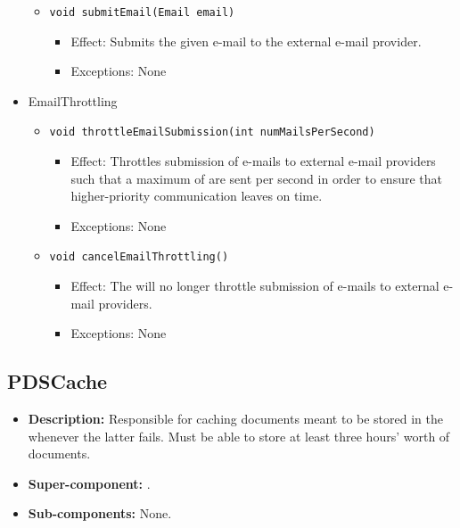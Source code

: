 \begin{itemize}
\begin{itemize}
		\item \texttt{void submitEmail(Email email)}
        \begin{itemize}
            \item Effect: Submits the given e-mail to the external e-mail provider.
            \item Exceptions: None
        \end{itemize}
    \end{itemize}

	\item EmailThrottling
    \begin{itemize}
        \item \texttt{void throttleEmailSubmission(int numMailsPerSecond)}
        \begin{itemize}
            \item Effect: Throttles submission of e-mails to external e-mail providers such that a maximum of  are sent per second in order to ensure that higher-priority communication leaves on time. 
            \item Exceptions: None
        \end{itemize}

		\item \texttt{void cancelEmailThrottling()}
        \begin{itemize}
            \item Effect: The  will no longer throttle submission of e-mails to external e-mail providers. 
            \item Exceptions: None
        \end{itemize}
    \end{itemize}
\end{itemize}

\subsection{PDSCache}
\begin{itemize}
    \item \textbf{Description:} Responsible for caching documents meant to be stored in the  whenever the latter fails. Must be able to store at least three hours' worth of documents.
    \item \textbf{Super-component:} .
    \item \textbf{Sub-components:} None.
\end{itemize}

